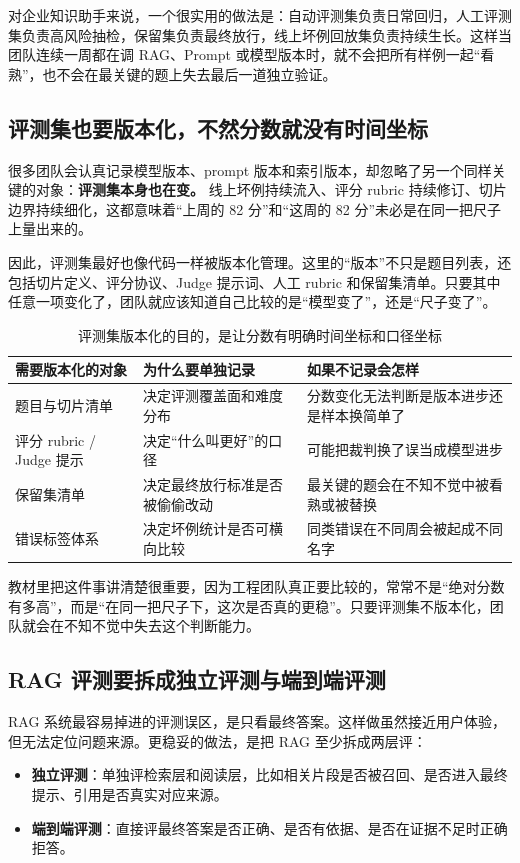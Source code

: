 对企业知识助手来说，一个很实用的做法是：自动评测集负责日常回归，人工评测集负责高风险抽检，保留集负责最终放行，线上坏例回放集负责持续生长。这样当团队连续一周都在调 RAG、Prompt 或模型版本时，就不会把所有样例一起“看熟”，也不会在最关键的题上失去最后一道独立验证。

\subsection{评测集也要版本化，不然分数就没有时间坐标}
很多团队会认真记录模型版本、prompt 版本和索引版本，却忽略了另一个同样关键的对象：\textbf{评测集本身也在变。} 线上坏例持续流入、评分 rubric 持续修订、切片边界持续细化，这都意味着“上周的 82 分”和“这周的 82 分”未必是在同一把尺子上量出来的。

因此，评测集最好也像代码一样被版本化管理。这里的“版本”不只是题目列表，还包括切片定义、评分协议、Judge 提示词、人工 rubric 和保留集清单。只要其中任意一项变化了，团队就应该知道自己比较的是“模型变了”，还是“尺子变了”。

\begin{table}[H]
\centering
\small
\begin{tabularx}{\textwidth}{>{\raggedright\arraybackslash}p{3cm}>{\raggedright\arraybackslash}p{3.2cm}>{\raggedright\arraybackslash}X}
\toprule
\textbf{需要版本化的对象} & \textbf{为什么要单独记录} & \textbf{如果不记录会怎样} \\
\midrule
题目与切片清单 & 决定评测覆盖面和难度分布 & 分数变化无法判断是版本进步还是样本换简单了 \\
评分 rubric / Judge 提示 & 决定“什么叫更好”的口径 & 可能把裁判换了误当成模型进步 \\
保留集清单 & 决定最终放行标准是否被偷偷改动 & 最关键的题会在不知不觉中被看熟或被替换 \\
错误标签体系 & 决定坏例统计是否可横向比较 & 同类错误在不同周会被起成不同名字 \\
\bottomrule
\end{tabularx}
\caption{评测集版本化的目的，是让分数有明确时间坐标和口径坐标}
\label{tab:eval-versioning}
\end{table}

教材里把这件事讲清楚很重要，因为工程团队真正要比较的，常常不是“绝对分数有多高”，而是“在同一把尺子下，这次是否真的更稳”。只要评测集不版本化，团队就会在不知不觉中失去这个判断能力。

\subsection{RAG 评测要拆成独立评测与端到端评测}
RAG 系统最容易掉进的评测误区，是只看最终答案。这样做虽然接近用户体验，但无法定位问题来源。更稳妥的做法，是把 RAG 至少拆成两层评：
\begin{itemize}
  \item \textbf{独立评测}：单独评检索层和阅读层，比如相关片段是否被召回、是否进入最终提示、引用是否真实对应来源。
  \item \textbf{端到端评测}：直接评最终答案是否正确、是否有依据、是否在证据不足时正确拒答。
\end{itemize}

